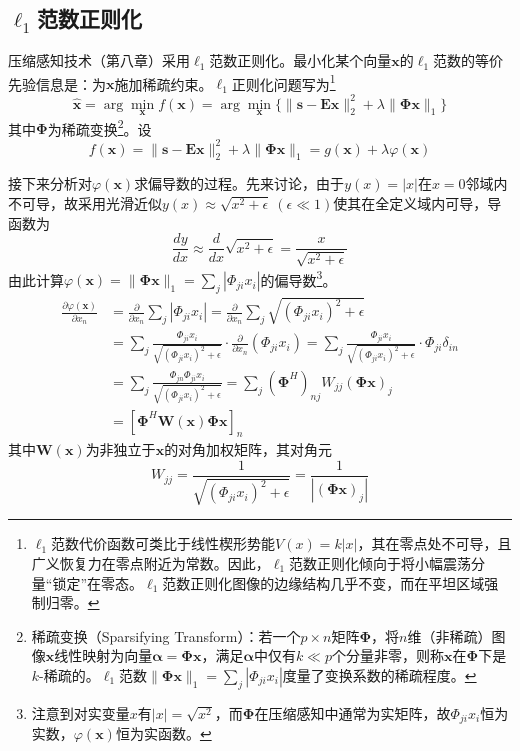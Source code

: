 \documentclass[12pt]{article}
\begin{document}
\subsection{$\ell_1$范数正则化}
压缩感知技术（第八章）采用$\ell_1$范数正则化。最小化某个向量$\bm{x}$的$\ell_1$范数的等价先验信息是：为$\bm{x}$施加稀疏约束。$\ell_1$正则化问题写为\footnote{$\ell_1$范数代价函数可类比于线性楔形势能$V(x)=k|x|$，其在零点处不可导，且广义恢复力在零点附近为常数。因此，$\ell_1$范数正则化倾向于将小幅震荡分量“锁定”在零态。$\ell_1$范数正则化图像的边缘结构几乎不变，而在平坦区域强制归零。}
\begin{equation}
    \hat{\bm{x}}=\arg\min_{\bm{x}}f(\bm{x})=\arg\min_{\bm{x}}\{\|\bm{s}-\mathbf{E}\bm{x}\|_2^2+\lambda\|\bm{\Phi}\bm{x}\|_1\}
    \label{equ:2.36}
\end{equation}
其中$\bm{\Phi}$为稀疏变换\footnote{稀疏变换（Sparsifying Transform）：若一个$p\times n$矩阵$\bm{\Phi}$，将$n$维（非稀疏）图像$\bm{x}$线性映射为向量$\bm{\alpha}=\bm{\Phi}\bm{x}$，满足$\bm{\alpha}$中仅有$k\ll p$个分量非零，则称$\bm{x}$在$\bm{\Phi}$下是$k$-稀疏的。$\ell_1$范数$\|\bm{\Phi}\bm{x}\|_1=\sum_j|\Phi_{ji}x_i|$度量了变换系数的稀疏程度。}。设
\begin{equation}
    f(\bm{x})=\|\bm{s}-\mathbf{E}\bm{x}\|_2^2+\lambda\|\bm{\Phi}\bm{x}\|_1=g(\bm{x})+\lambda\varphi(\bm{x})
\end{equation}

接下来分析对$\varphi(\bm{x})$求偏导数的过程。先来讨论，由于$y(x)=|x|$在$x=0$邻域内不可导，故采用光滑近似$y(x)\approx\sqrt{x^2+\epsilon}\ (\epsilon\ll 1)$使其在全定义域内可导，导函数为
\begin{equation}
    \frac{dy}{dx}\approx\frac{d}{dx}\sqrt{x^2+\epsilon}=\frac{x}{\sqrt{x^2+\epsilon}}
\end{equation}
由此计算$\varphi(\bm{x})=\|\bm{\Phi}\bm{x}\|_1=\sum_j|\Phi_{ji}x_i|$的偏导数\footnote{注意到对实变量$x$有$|x|=\sqrt{x^2}$，而$\bm{\Phi}$在压缩感知中通常为实矩阵，故$\Phi_{ji}x_i$恒为实数，$\varphi(\bm{x})$恒为实函数。}。
\begin{equation}
    \begin{aligned}
        \frac{\partial \varphi(\bm{x})}{\partial x_n}
        &=\frac{\partial}{\partial x_n}\sum_j|\Phi_{ji}x_i|
        =\frac{\partial}{\partial x_n}\sum_j\sqrt{(\Phi_{ji}x_i)^2+\epsilon} \\
        &=\sum_j\frac{\Phi_{ji}x_i}{\sqrt{(\Phi_{ji}x_i)^2+\epsilon}}\cdot\frac{\partial}{\partial x_n}(\Phi_{ji}x_i)
        =\sum_j\frac{\Phi_{ji}x_i}{\sqrt{(\Phi_{ji}x_i)^2+\epsilon}}\cdot\Phi_{ji}\delta_{in} \\
        &=\sum_j\frac{\Phi_{jn}\Phi_{ji}x_i}{\sqrt{(\Phi_{ji}x_i)^2+\epsilon}}
        =\sum_j\left(\bm{\Phi}^H\right)_{nj}W_{jj}\left(\bm{\Phi}\bm{x}\right)_j \\
        &=\left[\bm{\Phi}^H\mathbf{W}(\bm{x})\bm{\Phi}\bm{x}\right]_n
    \end{aligned}
    \label{equ:2.37}
\end{equation}
其中$\mathbf{W}(\bm{x})$为非独立于$\bm{x}$的对角加权矩阵，其对角元
\begin{equation}
    W_{jj}=\frac{1}{\sqrt{(\Phi_{ji}x_i)^2+\epsilon}}=\frac{1}{|(\bm{\Phi}\bm{x})_j|}
\end{equation}
\end{document}
